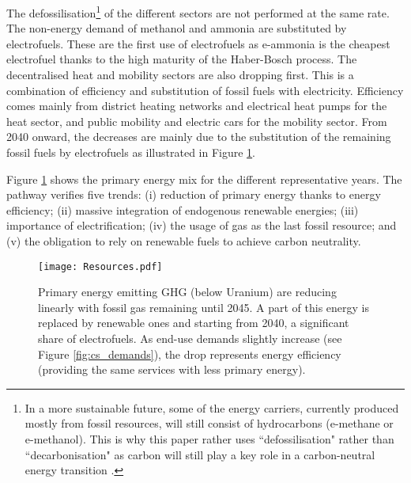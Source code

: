 The defossilisation\footnote{In a more sustainable future, some of the energy carriers, currently produced mostly from fossil resources, will still consist of hydrocarbons (\eg e-methane or e-methanol). This is why this paper rather uses ``defossilisation" rather than ``decarbonisation" as carbon will still play a key role in a carbon-neutral energy transition \cite{mertens2020carbon}.} of the different sectors are not performed at the same rate. The non-energy demand of methanol and ammonia are substituted by electrofuels. These are the first use of electrofuels as  e-ammonia is the cheapest electrofuel thanks to the high maturity of the Haber-Bosch process. The decentralised heat and mobility sectors are also dropping first. This is a combination of efficiency and substitution of fossil fuels with electricity. Efficiency comes mainly from district heating networks and electrical heat pumps for the heat sector, and public mobility and electric cars for the mobility sector. From 2040 onward, the decreases are mainly due to the substitution of the remaining fossil fuels by electrofuels as illustrated in Figure \ref{fig:pestd_primary_energy}.

Figure \ref{fig:pestd_primary_energy} shows the primary energy mix for the different representative years. The pathway verifies five trends: (i) reduction of primary energy thanks to energy efficiency; (ii) massive integration of endogenous renewable energies; (iii) importance of electrification; (iv) the usage of gas as the last fossil resource; and (v) the obligation to rely on renewable fuels to achieve carbon neutrality.

 \begin{figure}[!htbp]
\centering
\texttt{[image: Resources.pdf]}
\caption{Primary energy emitting \gls{GHG} (below Uranium) are reducing linearly with fossil gas remaining until 2045. A part of this energy is replaced by renewable ones and starting from 2040, a significant share of electrofuels. As end-use demands slightly increase (see Figure \ref{fig:cs_demands}), the drop represents energy efficiency (\ie providing the same services with less primary energy).}
\label{fig:pestd_primary_energy}
\end{figure}

